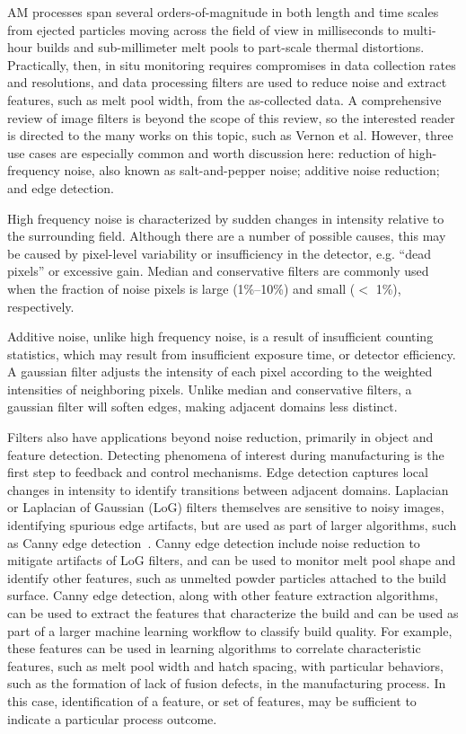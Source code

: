 AM processes span several orders-of-magnitude in both length and time scales from ejected particles moving across the field of view in milliseconds to multi-hour builds and sub-millimeter melt pools to part-scale thermal distortions. Practically, then, in situ monitoring requires compromises in data collection rates and resolutions, and data processing filters are used to reduce noise and extract features, such as melt pool width, from the as-collected data. A comprehensive review of image filters is beyond the scope of this review, so the interested reader is directed to the many works on this topic, such as Vernon et al\cite{Vernon1991}. However, three use cases are especially common and worth discussion here: reduction of high-frequency noise, also known as salt-and-pepper noise; additive noise reduction; and edge detection.

High frequency noise is characterized by sudden changes in intensity relative to the surrounding field. Although there are a number of possible causes, this may be caused by pixel-level variability or insufficiency in the detector, e.g. ``dead pixels'' or excessive gain. Median and conservative filters are commonly used when the fraction of noise pixels is large (1\%--10\%) and small ($<$ 1\%), respectively.

Additive noise, unlike high frequency noise, is a result of insufficient counting statistics, which may result from insufficient exposure time, or detector efficiency. A gaussian filter adjusts the intensity of each pixel according to the weighted intensities of neighboring pixels. Unlike median and conservative filters, a gaussian filter will soften edges, making adjacent domains less distinct.

Filters also have applications beyond noise reduction, primarily in object and feature detection. Detecting phenomena of interest during manufacturing is the first step to feedback and control mechanisms. Edge detection captures local changes in intensity to identify transitions between adjacent domains. Laplacian or Laplacian of Gaussian (LoG) filters themselves are sensitive to noisy images, identifying spurious edge artifacts, but are used as part of larger algorithms, such as Canny edge detection~\cite{Canny1986}. Canny edge detection include noise reduction to mitigate artifacts of LoG filters, and can be used to monitor melt pool shape and identify other features, such as unmelted powder particles attached to the build surface. Canny edge detection, along with other feature extraction algorithms, can be used to extract the features that characterize the build and can be used as part of a larger machine learning workflow to classify build quality. For example, these features can be used in learning algorithms to correlate characteristic features, such as melt pool width and hatch spacing, with particular behaviors, such as the formation of lack of fusion defects, in the manufacturing process. In this case, identification of a feature, or set of features, may be sufficient to indicate a particular process outcome.

